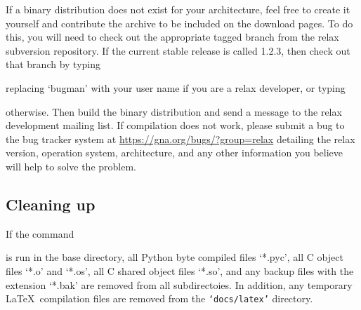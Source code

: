 
If a binary distribution does not exist for your architecture, feel free to create it yourself and contribute the archive to be included on the download pages.  To do this, you will need to check out the appropriate tagged branch from the relax subversion repository.  If the current stable release is called 1.2.3, then check out that branch by typing


replacing `bugman' with your user name if you are a relax developer, or typing


otherwise.  Then build the binary distribution and send a message to the relax development mailing list.  If compilation does not work, please submit a bug to the bug tracker system at \href{https://gna.org/bugs/?group=relax}{https://gna.org/bugs/?group=relax} detailing the relax version, operation system, architecture, and any other information you believe will help to solve the problem.


\subsection{Cleaning up}

If the command


is run in the base directory, all Python byte compiled files `*.pyc', all C object files `*.o' and `*.os', all C shared object files `*.so', and any backup files with the extension `*.bak' are removed from all subdirectoies.  In addition, any temporary \LaTeX\ compilation files are removed from the \texttt{`docs/latex'} directory.
